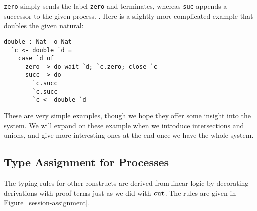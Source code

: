 \documentclass[a4paper,USenglish]{lipics-v2016}
\begin{document}
\texttt{zero} simply sends the label \texttt{zero} and terminates, whereas \texttt{suc} appends a successor to the given process. . Here is a slightly more complicated example that doubles the given natural:

\begin{lstlisting}[language=krill, style=custom]
  double : Nat -o Nat
  `c <- double `d =
    case `d of
      zero -> do wait `d; `c.zero; close `c
      succ -> do
        `c.succ
        `c.succ
        `c <- double `d
\end{lstlisting}

These are very simple examples, though we hope they offer some insight into the system. We will expand on these example when we introduce intersections and unions, and give more interesting ones at the end once we have the whole system.


\subsection{Type Assignment for Processes}

The typing rules for other constructs are derived from linear logic by decorating derivations with proof terms just as we did with $\texttt{cut}$. The rules are given in Figure~\ref{session-assignment}.  

\end{document}
